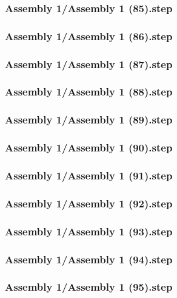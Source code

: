 \documentclass[a4paper,12pt]{article}
\begin{document}
\subsubsection{Assembly 1/Assembly 1 (85).step}

\subsubsection{Assembly 1/Assembly 1 (86).step}

\subsubsection{Assembly 1/Assembly 1 (87).step}

\subsubsection{Assembly 1/Assembly 1 (88).step}

\subsubsection{Assembly 1/Assembly 1 (89).step}

\subsubsection{Assembly 1/Assembly 1 (90).step}

\subsubsection{Assembly 1/Assembly 1 (91).step}

\subsubsection{Assembly 1/Assembly 1 (92).step}

\subsubsection{Assembly 1/Assembly 1 (93).step}

\subsubsection{Assembly 1/Assembly 1 (94).step}

\subsubsection{Assembly 1/Assembly 1 (95).step}

\end{document}
